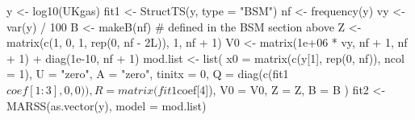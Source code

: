 \begin{Schunk}
\begin{Sinput}
 y <- log10(UKgas)
 fit1 <- StructTS(y, type = "BSM")
 nf <- frequency(y)
 vy <- var(y) / 100
 B <- makeB(nf) # defined in the BSM section above
 Z <- matrix(c(1, 0, 1, rep(0, nf - 2L)), 1, nf + 1)
 V0 <- matrix(1e+06 * vy, nf + 1, nf + 1) + diag(1e-10, nf + 1)
 mod.list <- list(
   x0 = matrix(c(y[1], rep(0, nf)), ncol = 1), U = "zero", A = "zero", tinitx = 0,
   Q = diag(c(fit1$coef[1:3], 0, 0)), R = matrix(fit1$coef[4]), V0 = V0, Z = Z, B = B
 )
 fit2 <- MARSS(as.vector(y), model = mod.list)
\end{Sinput}
\end{Schunk}
